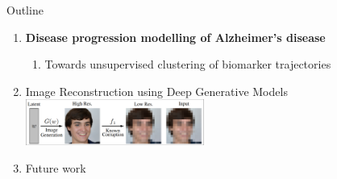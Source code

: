 \documentclass[8pt,xcolor=table]{beamer}
\begin{document}
\begin{frame}{Outline}

\begin{enumerate}
 \item \textbf{Disease progression modelling of Alzheimer's disease}
 \begin{enumerate} 
  \item Towards unsupervised clustering of biomarker trajectories\\
 \end{enumerate}
   
 
  
  \vt

 \item Image Reconstruction using Deep Generative Models\\
 \includegraphics[height=1.5cm, trim=6 6 300 6,clip]{brgm_diagram_small}
\vt
 
  \item Future work\\

\end{enumerate}
\end{frame}



\end{document}
